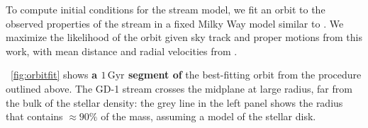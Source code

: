 \documentclass[modern]{aastex62}
\newcommand{\package}[1]{\textsl{#1}}
\newcommand{\kpc}{\textrm{kpc}}
\newcommand{\kms}{\ensuremath{\textrm{km}~\textrm{s}^{-1}}}
\newcommand{\changes}[1]{{\textbf{#1}}}
\begin{document}
To compute initial conditions for the stream model, we fit an orbit to the
observed properties of the stream in a fixed Milky Way model similar to \citet{Bovy:2015}.
We maximize the likelihood of the orbit given sky track and proper motions from
this work, with mean distance and radial velocities from
\cite{Koposov:2010}.

\figurename~\ref{fig:orbitfit} shows \changes{a $1\,\textrm{Gyr}$ segment of} the best-fitting orbit from the procedure outlined above.
The GD-1 stream crosses the midplane at large radius, far from the bulk of the
stellar density:
the grey line in the left panel shows the radius that contains $\approx 90\%$ of
the mass, assuming a \citet{Bovy:2012} model of the stellar disk.
\end{document}
